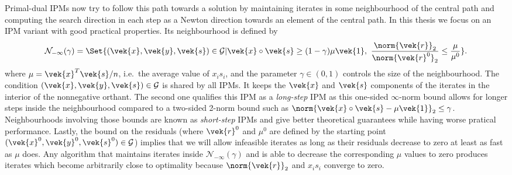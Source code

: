 Primal-dual IPMs now try to follow this path towards a solution by maintaining iterates in some neighbourhood of the central path and computing the search direction in each step as a Newton direction towards an element of the central path.
In this thesis we focus on an IPM variant with good practical properties.
Its neighbourhood is defined by
\begin{equation}
  \mathcal{N}_{-\infty}(\gamma) = \Set{ (\vek{x}, \vek{y}, \vek{s}) \in \mathcal{G} | \vek{x} \circ \vek{s} \geq (1 - \gamma) \mu \vek{1}, \ \frac{\norm{\vek{r}}_2}{\norm{\vek{r}^0}_2} \leq \frac{\mu}{\mu^0} }. \label{eqn:neighbourhood}
\end{equation}
where \(\mu = \vek{x}^T \vek{s}/n\), i.e.\ the average value of \(x_i s_i\), and the parameter \(\gamma \in (0, 1)\) controls the size of the neighbourhood.
The condition \((\vek{x}, \vek{y}, \vek{s}) \in \mathcal{G}\) is shared by all IPMs.
It keeps the \(\vek{x}\) and \(\vek{s}\) components of the iterates in the interior of the nonnegative orthant.
The second one qualifies this IPM as a \emph{long-step} IPM as this one-sided \(\infty\)-norm bound allows for longer steps inside the neighbourhood compared to a two-sided 2-norm bound such as \(\norm{\vek{x} \circ \vek{s} - \mu \vek{1}}_2 \leq \gamma\).
Neighbourhoods involving those bounds are known as \emph{short-step} IPMs and give better theoretical guarantees while having worse pratical performance.
Lastly, the bound on the residuals (where \(\vek{r}^0\) and \(\mu^0\) are defined by the starting point \((\vek{x}^0, \vek{y}^0, \vek{s}^0) \in \mathcal{G}\)) implies that we will allow infeasible iterates as long as their residuals decrease to zero at least as fast as \(\mu\) does.
Any algorithm that maintains iterates inside \(\mathcal{N}_{-\infty}(\gamma)\) and is able to decrease the corresponding \(\mu\) values to zero produces iterates which become arbitrarily close to optimality because \(\norm{\vek{r}}_2\) and \(x_i s_i\) converge to zero.

